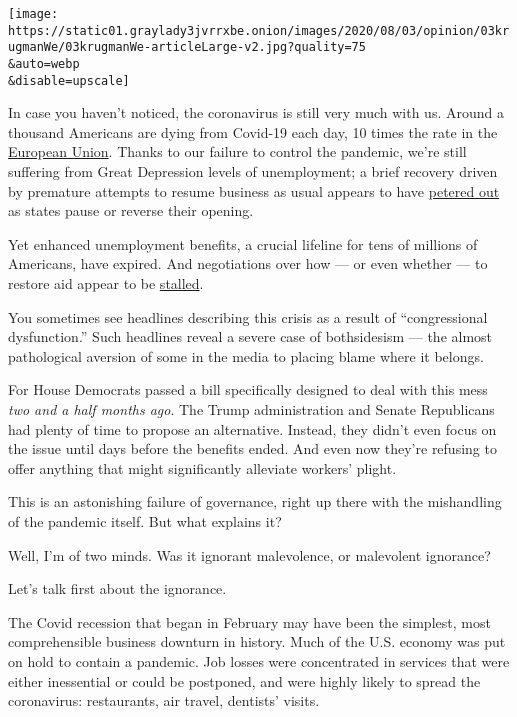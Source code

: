 \texttt{[image: https://static01.graylady3jvrrxbe.onion/images/2020/08/03/opinion/03krugmanWe/03krugmanWe-articleLarge-v2.jpg?quality=75\\\&auto=webp\\\&disable=upscale]}

In case you haven't noticed, the coronavirus is still very much with us.
Around a thousand Americans are dying from Covid-19 each day, 10 times
the rate in the
\href{https://ourworldindata.org/coronavirus-data-explorer?zoomToSelection=true\&deathsMetric=true\&interval=smoothed\&smoothing=7\&country=USA~EuropeanUnion\&pickerMetric=location\&pickerSort=asc}{European
Union}. Thanks to our failure to control the pandemic, we're still
suffering from Great Depression levels of unemployment; a brief recovery
driven by premature attempts to resume business as usual appears to have
\href{https://www.calculatedriskblog.com/2020/08/forecasts-for-july-employment-report.html}{petered
out} as states pause or reverse their opening.

Yet enhanced unemployment benefits, a crucial lifeline for tens of
millions of Americans, have expired. And negotiations over how --- or
even whether --- to restore aid appear to be
\href{https://www.nytimes3xbfgragh.onion/2020/08/02/us/politics/coronavirus-jobless-aid.html?action=click\&module=Top\%20Stories\&pgtype=Homepage}{stalled}.

You sometimes see headlines describing this crisis as a result of
``congressional dysfunction.'' Such headlines reveal a severe case of
bothsidesism --- the almost pathological aversion of some in the media
to placing blame where it belongs.

For House Democrats passed a bill specifically designed to deal with
this mess \emph{two and a half months ago}. The Trump administration and
Senate Republicans had plenty of time to propose an alternative.
Instead, they didn't even focus on the issue until days before the
benefits ended. And even now they're refusing to offer anything that
might significantly alleviate workers' plight.

This is an astonishing failure of governance, right up there with the
mishandling of the pandemic itself. But what explains it?

Well, I'm of two minds. Was it ignorant malevolence, or malevolent
ignorance?

Let's talk first about the ignorance.

The Covid recession that began in February may have been the simplest,
most comprehensible business downturn in history. Much of the U.S.
economy was put on hold to contain a pandemic. Job losses were
concentrated in services that were either inessential or could be
postponed, and were highly likely to spread the coronavirus:
restaurants, air travel, dentists' visits.


